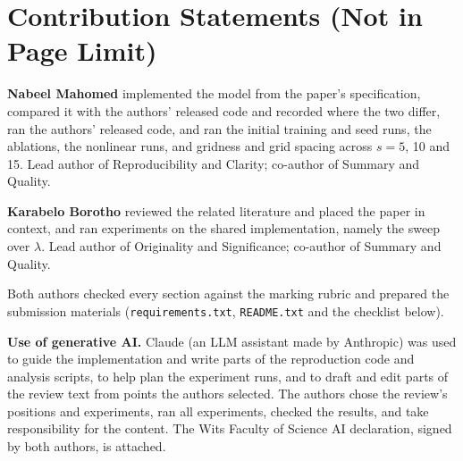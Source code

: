 \documentclass[10pt,letterpaper]{article}
\begin{document}
\section{Contribution Statements (Not in Page Limit)}
\textbf{Nabeel Mahomed} implemented the model from the paper's specification, compared it with the authors' released code and recorded where the two differ, ran the authors' released code, and ran the initial training and seed runs, the ablations, the nonlinear runs, and gridness and grid spacing across $s = 5$, 10 and 15. Lead author of Reproducibility and Clarity; co-author of Summary and Quality.
 
\textbf{Karabelo Borotho} reviewed the related literature and placed the paper in context, and ran experiments on the shared implementation, namely the sweep over $\lambda$. Lead author of Originality and Significance; co-author of Summary and Quality.
 
Both authors checked every section against the marking rubric and prepared the submission materials (\texttt{requirements.txt}, \texttt{README.txt} and the checklist below).

\textbf{Use of generative AI.} Claude (an LLM assistant made by Anthropic) was used to guide the implementation and write parts of the reproduction code and analysis scripts, to help plan the experiment runs, and to draft and edit parts of the review text from points the authors selected. The authors chose the review's positions and experiments, ran all experiments, checked the results, and take responsibility for the content. The Wits Faculty of Science AI declaration, signed by both authors, is attached.
 
 
\clearpage
\end{document}
